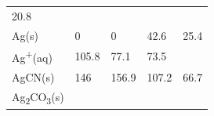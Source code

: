 \documentclass[
  9pt,
]{extbook}
\theoremstyle{definition}
\theoremstyle{definition}
\theoremstyle{definition}
\theoremstyle{remark}
\begin{document}
\begin{longtable}[]{@{}lllll@{}}
\begin{minipage}[t]{0.18\columnwidth}
20.8\strut
\end{minipage}\tabularnewline
\begin{minipage}[t]{0.10\columnwidth}\raggedright
Ag(s)\strut
\end{minipage} & \begin{minipage}[t]{0.19\columnwidth}\raggedright
0\strut
\end{minipage} & \begin{minipage}[t]{0.20\columnwidth}\raggedright
0\strut
\end{minipage} & \begin{minipage}[t]{0.18\columnwidth}\raggedright
42.6\strut
\end{minipage} & \begin{minipage}[t]{0.18\columnwidth}\raggedright
25.4\strut
\end{minipage}\tabularnewline
\begin{minipage}[t]{0.10\columnwidth}\raggedright
Ag\textsuperscript{+}(aq)\strut
\end{minipage} & \begin{minipage}[t]{0.19\columnwidth}\raggedright
105.8\strut
\end{minipage} & \begin{minipage}[t]{0.20\columnwidth}\raggedright
77.1\strut
\end{minipage} & \begin{minipage}[t]{0.18\columnwidth}\raggedright
73.5\strut
\end{minipage} & \begin{minipage}[t]{0.18\columnwidth}\raggedright
\strut
\end{minipage}\tabularnewline
\begin{minipage}[t]{0.10\columnwidth}\raggedright
AgCN(s)\strut
\end{minipage} & \begin{minipage}[t]{0.19\columnwidth}\raggedright
146\strut
\end{minipage} & \begin{minipage}[t]{0.20\columnwidth}\raggedright
156.9\strut
\end{minipage} & \begin{minipage}[t]{0.18\columnwidth}\raggedright
107.2\strut
\end{minipage} & \begin{minipage}[t]{0.18\columnwidth}\raggedright
66.7\strut
\end{minipage}\tabularnewline
\begin{minipage}[t]{0.10\columnwidth}\raggedright
Ag\textsubscript{2}CO\textsubscript{3}(s)\strut

\end{minipage}
\end{longtable}
\end{document}
